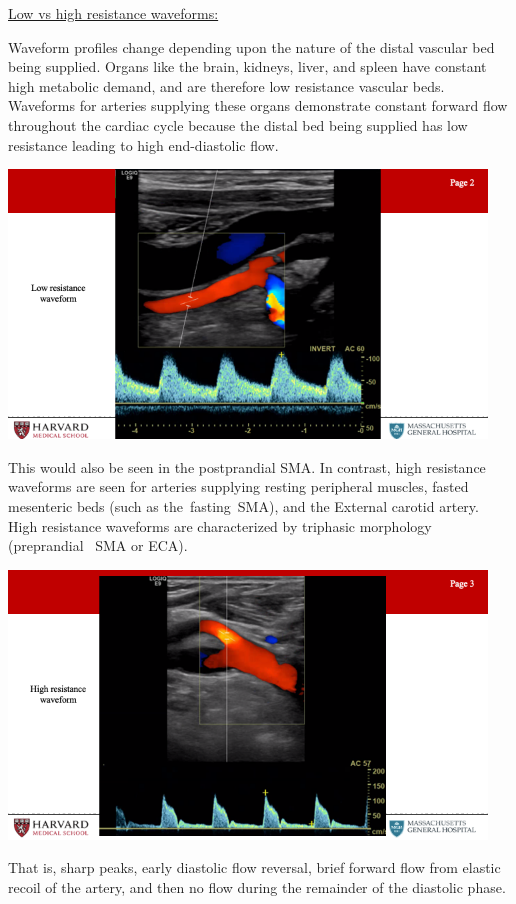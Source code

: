 \documentclass[
]{book}
\begin{document}
\underline{Low vs high resistance waveforms:}

Waveform profiles change depending upon the nature of the distal
vascular bed being supplied. Organs like the brain, kidneys, liver, and
spleen have constant high metabolic demand, and are therefore low
resistance vascular beds. Waveforms for arteries supplying these organs
demonstrate constant forward flow throughout the cardiac cycle because
the distal bed being supplied has low resistance leading to high
end-diastolic flow.

\includegraphics[width=5in]{images/vasc_lab/Slide3}

This would also be seen in the postprandial SMA. In contrast, high
resistance waveforms are seen for arteries supplying resting peripheral
muscles, fasted mesenteric beds (such as the~fasting~SMA), and the
External carotid artery. High resistance waveforms are characterized by
triphasic morphology (preprandial~ SMA or ECA).

\includegraphics[width=5in]{images/vasc_lab/Slide4}

That is, sharp peaks, early diastolic flow reversal, brief forward flow
from elastic recoil of the artery, and then no flow during the remainder
of the diastolic phase.
\end{document}
